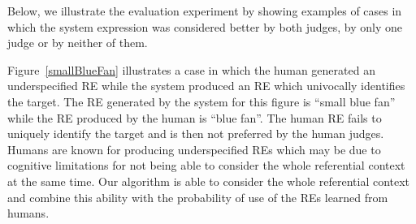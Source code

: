 Below, we illustrate the evaluation experiment by showing examples of cases in which the system expression was considered better by both judges, by only one judge or by neither of them. 

Figure~\ref{smallBlueFan} illustrates a case in which the human generated an underspecified RE while the system produced an RE which univocally identifies the target. The RE generated by the system for this figure is ``small blue fan'' while the RE produced by the human is ``blue fan''. The human RE fails to uniquely identify the target and is then not preferred by the human judges. Humans are known for producing underspecified REs which may be due to cognitive limitations for not being able to consider the whole referential context at the same time. Our algorithm is able to consider the whole referential context and combine this ability with the probability of use of the REs learned from humans. 

